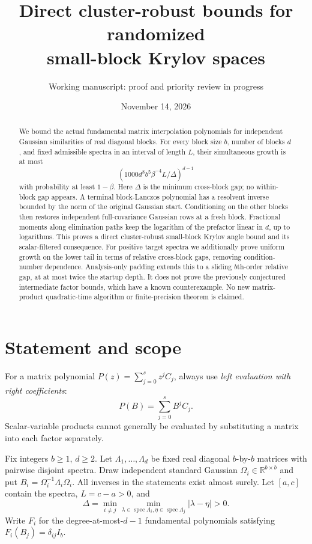 \documentclass[11pt]{article}
\title{Direct cluster-robust bounds for randomized\\small-block Krylov spaces}
\author{Working manuscript: proof and priority review in progress}
\date{November 14, 2026}
\newcommand{\R}{\mathbb R}
\begin{document}
\maketitle
\begin{abstract}
We bound the actual fundamental matrix interpolation polynomials for
independent Gaussian similarities of real diagonal blocks. For every block
size $b$, number of blocks $d$, and fixed admissible spectra in an interval
of length $L$, their simultaneous growth is at most
\[
 (1000d^8b^5\beta^{-4}L/\Delta)^{d-1}
\]
with probability at least $1-\beta$.
Here $\Delta$ is the minimum cross-block gap; no within-block gap appears.
A terminal block-Lanczos polynomial has a resolvent inverse bounded by the
norm of the original Gaussian start. Conditioning on the other blocks then
restores independent full-covariance Gaussian rows at a fresh block.
Fractional moments along elimination paths keep the logarithm of the
prefactor linear in $d$, up to logarithms. This proves a direct
cluster-robust small-block Krylov angle bound and its scalar-filtered
consequence. For positive target spectra we additionally prove uniform
growth on the lower tail in terms of relative cross-block gaps, removing
condition-number dependence. Analysis-only padding extends this to a
sliding $b$th-order relative gap, at at most twice the startup depth.
It does not prove the previously conjectured intermediate
factor bounds, which have a known counterexample. No new matrix-product
quadratic-time algorithm or finite-precision theorem is claimed.
\end{abstract}

\section{Statement and scope}
For a matrix polynomial $P(z)=\sum_{j=0}^{s}z^j C_j$, always use
\emph{left evaluation with right coefficients}:
\[
 P(B)=\sum_{j=0}^{s}B^j C_j.
\]
Scalar-variable products cannot generally be evaluated by substituting a
matrix into each factor separately.

Fix integers $b\geq1$, $d\geq2$. Let $\Lambda_1,\ldots,\Lambda_d$
be fixed real diagonal $b$-by-$b$ matrices with pairwise disjoint spectra.
Draw independent standard Gaussian $\Omega_i\in\R^{b\times b}$ and put
$B_i=\Omega_i^{-1}\Lambda_i\Omega_i$. All inverses in the statements
exist almost surely. Let $[a,c]$ contain the spectra, $L=c-a>0$, and
\[
 \Delta=\min_{i\ne j}\min_{\lambda\in\operatorname{spec}\Lambda_i,
                 \eta\in\operatorname{spec}\Lambda_j}|\lambda-\eta|>0.
\]
Write $F_i$ for the degree-at-most-$d-1$ fundamental polynomials satisfying
$F_i(B_j)=\delta_{ij}I_b$.
\end{document}
